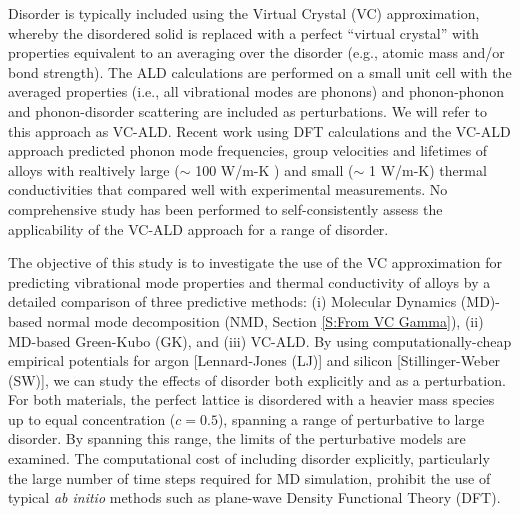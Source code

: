\documentclass[aps,prb,onecolumn,preprint,superscriptaddress,amsmath,amssymb,floatfix]{revtex4}
\begin{document}
Disorder is typically included using the Virtual Crystal (VC) 
approximation, whereby the disordered  
solid is replaced with a perfect “virtual crystal” with properties 
equivalent to an averaging over the disorder 
(e.g., atomic mass and/or bond strength).\cite{abeles_lattice_1963}
The ALD calculations are performed on a small 
unit cell with the averaged properties 
(i.e., all vibrational modes are phonons) and 
phonon-phonon and phonon-disorder scattering 
are included as perturbations.
\cite{abeles_lattice_1963,tamura_isotope_1983,
tian_phonon_2012,lindsay_thermal_2012} 
We will refer to this approach as VC-ALD. 
Recent work using DFT calculations and the VC-ALD approach 
predicted phonon mode frequencies, group velocities and lifetimes  
of alloys with realtively
large ($\sim$ 100 W/m-K
\cite{garg_role_2011,lindsay_thermal_2012}) and 
small ($\sim$ 1 W/m-K\cite{tian_phonon_2012}) 
thermal conductivities that compared well with experimental 
measurements. 
No comprehensive study has been performed 
to self-consistently assess the applicability of 
the VC-ALD approach for a range 
of disorder.

The objective of this study is to investigate the use of the VC 
approximation for predicting vibrational mode properties and 
thermal conductivity of alloys by a detailed comparison 
of three predictive methods: (i) Molecular Dynamics (MD)-based 
normal mode 
decomposition (NMD, Section \ref{S:From VC Gamma}), 
(ii) MD-based Green-Kubo (GK), 
and (iii) VC-ALD. By using computationally-cheap 
empirical potentials for argon [Lennard-Jones (LJ)]
\cite{ashcroft_solid_1976} 
and silicon [Stillinger-Weber (SW)],\cite{stillinger_computer_1985}   
we can study the effects of disorder both explicitly 
and as a perturbation. For both materials, the perfect lattice is 
disordered with a heavier mass species up to equal 
concentration ($c=0.5$), spanning 
a range of perturbative to large disorder. By spanning this range, 
the limits of the perturbative models are examined.
The computational cost of including disorder explicitly, 
particularly the large number of time steps required 
for MD simulation, 
prohibit the use of typical 
\emph{ab initio} methods such as 
plane-wave Density Functional Theory (DFT).
\cite{koker_thermal_2009,sosso_thermal_2012}
\end{document}
